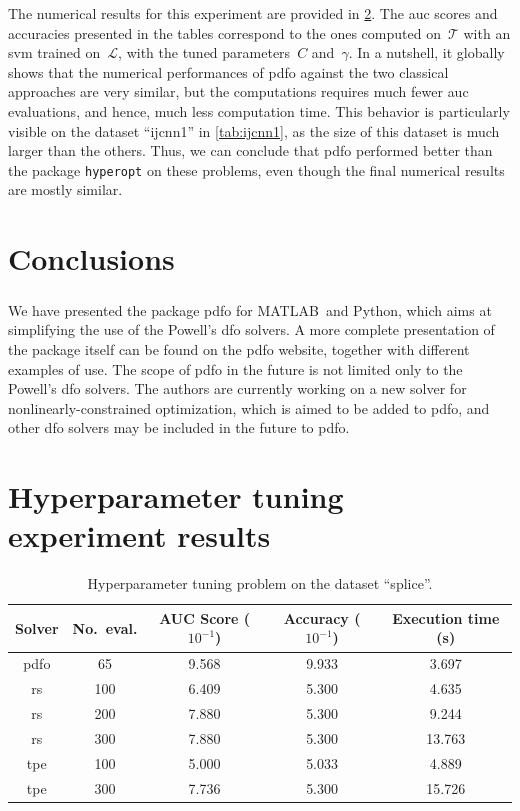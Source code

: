 \documentclass[11pt,draft]{article}
\numberwithin{equation}{section}
\def\matlab{\mbox{MATLAB\textsuperscript{\textregistered}}}
\def\python{\mbox{Python}}
\begin{document}
The numerical results for this experiment are provided in \cref{sec:htres}.
The \gls{auc} scores and accuracies presented in the tables correspond to the ones computed on~$\mathcal{T}$ with an \gls{svm} trained on~$\mathcal{L}$, with the tuned parameters~$C$ and~$\gamma$.
In a nutshell, it globally shows that the numerical performances of \gls{pdfo} against the two classical approaches are very similar, but the computations requires much fewer \gls{auc} evaluations, and hence, much less computation time.
This behavior is particularly visible on the dataset \enquote{ijcnn1} in \cref{tab:ijcnn1}, as the size of this dataset is much larger than the others.
Thus, we can conclude that \gls{pdfo} performed better than the package \texttt{hyperopt} on these problems, even though the final numerical results are mostly similar.

\section{Conclusions}

We have presented the package \gls{pdfo} for \matlab\ and \python, which aims at simplifying the use of the Powell's \gls{dfo} solvers.
A more complete presentation of the package itself can be found on the \gls{pdfo} website, together with different examples of use.
The scope of \gls{pdfo} in the future is not limited only to the Powell's \gls{dfo} solvers.
The authors are currently working on a new solver for nonlinearly-constrained optimization, which is aimed to be added to \gls{pdfo}, and other \gls{dfo} solvers may be included in the future to \gls{pdfo}.

\printbibliography

\appendix
\clearpage

\section{Hyperparameter tuning experiment results}
\label{sec:htres}

\begin{table}[!ht]
    \caption{Hyperparameter tuning problem on the dataset \enquote{splice}.}
    \centering
    \begin{tabular}{cS[table-parse-only]SSS}
        \toprule
        Solver                          &
            {No.\ eval.}                &
            {AUC Score ($10^{-1}$)}     &
            {Accuracy ($10^{-1}$)}      &
            {Execution time (\si{\second})}\\
        \midrule
        \gls{pdfo}  & 65    & 9.568 & 9.933 & 3.697\\
        \gls{rs}    & 100   & 6.409 & 5.300 & 4.635\\
        \gls{rs}    & 200   & 7.880 & 5.300 & 9.244\\
        \gls{rs}    & 300   & 7.880 & 5.300 & 13.763\\
        \gls{tpe}   & 100   & 5.000 & 5.033 & 4.889\\
        \gls{tpe}   & 300   & 7.736 & 5.300 & 15.726\\
        \bottomrule
    \end{tabular}
\end{table}
\end{document}
